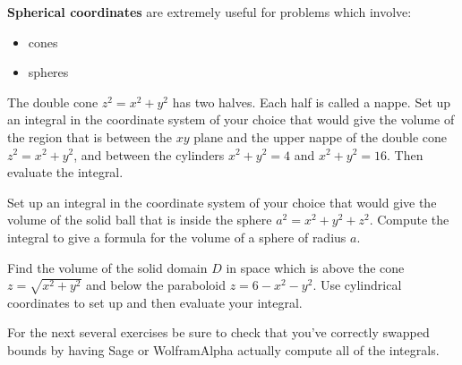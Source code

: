 \textbf{Spherical coordinates} are extremely useful for problems which involve:
\begin{itemize}\itemsep2pt
\item cones
\item spheres
\end{itemize}

\vskip0.1in

\begin{problem}%
 The double cone $z^2=x^2+y^2$ has two halves.  Each half is called a nappe. Set up an integral in the coordinate system of your choice that would give the volume of the region that is between the $xy$ plane and the upper nappe of the double cone $z^2=x^2+y^2$, and between the cylinders $x^2+y^2=4$ and $x^2+y^2=16$.  Then evaluate the integral.
\end{problem}

\begin{problem}
 Set up an integral in the coordinate system of your choice that would give the volume of the solid ball that is inside the sphere $a^2=x^2+y^2+z^2$. Compute the integral to give a formula for the volume of a sphere of radius $a$.  
\end{problem}


\begin{problem}%
Find the volume of the solid domain $D$ in space which is above the cone $z=\sqrt{x^2+y^2}$ and below the paraboloid $z=6-x^2-y^2$. Use cylindrical coordinates to set up and then evaluate your integral.  
\end{problem}

For the next several exercises be sure to check that you've correctly swapped bounds by having Sage or WolframAlpha actually compute all of the integrals.

